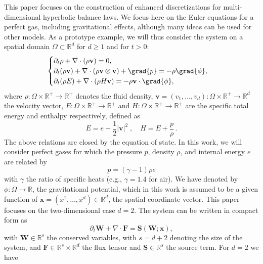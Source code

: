 \documentclass[a4paper,10pt]{article}
\begin{document}
This paper focuses on the construction of  enhanced discretizations for multi-dimensional hyperbolic balance laws. 
We focus here on  the Euler equations for a perfect gas, including gravitational effects, although many ideas can be used for other models.
As a prototype example, we will thus consider the system on a spatial domain $\Omega \subset \mathbb{R}^d$ for $d\geq 1$ and for $t>0$:
\begin{equation}\label{Euler_Eq0}
\begin{cases}
	\partial_t \rho + \nabla \cdot (\rho \mathbf{v}) = 0, \\
	\partial_t (\rho \mathbf{v}) + \nabla \cdot (\rho \mathbf{v} \otimes \mathbf{v}) + \grad{p} = -\rho \grad{\phi}, \\
	\partial_t (\rho E) + \nabla \cdot (\rho H \mathbf{v}) = -\rho \mathbf{v} \cdot \grad{\phi},
\end{cases}
\end{equation}
where $\rho : \Omega \times \mathbb R^+ \to \mathbb R^+ $ denotes the fluid density, $\mathbf{v} = (  v_1,\dots,v_d): \Omega \times \mathbb R^+ \to \mathbb R^d$ the velocity vector, $E: \Omega \times \mathbb R^+ \to \mathbb R^+ $ and $H: \Omega \times \mathbb R^+ \to \mathbb R^+ $ are the specific total energy and enthalpy respectively,
defined as
\begin{equation}\label{Euler_Eq1}
E = e + \dfrac{1}{2}|\mathbf{v}|^2\;,\quad H = E + \dfrac{p}{\rho}\,.
\end{equation}
The above relations are closed by the equation of state. In this work, we will consider perfect gases for which
the pressure $p$, density $\rho$, and  internal energy $e$ are related by
\begin{equation}\label{Euler_Eq2}
 p = (\gamma - 1)\rho e 
 \end{equation}
with $\gamma$ the ratio of specific heats (e.g., $\gamma = 1.4$ for air). We have denoted by $\phi : \Omega \to \mathbb R$, the gravitational potential,
which in this work is assumed to be a given function of  $\mathbf{x} =( x^1,\dots,x^d)\in\mathbb{R}^d$, the spatial coordinate vector. This paper focuses on the two-dimensional case $d=2$. The system can be  written in compact form as 
\begin{equation}\label{Euler_Eq3}
	\partial_t \bm{W} + \nabla\cdot  \mathbf{F}  = \mathbf{S}(\bm{W};\mathbf{x}),
\end{equation}
with $\bm{W}\in \mathbb R^{s}$ the conserved variables, with $s=d+2$ denoting the size of the system, and  $\mathbf{F}\in \mathbb{R}^{s}\times\mathbb{R}^{d}$ the flux tensor and $\mathbf{S}\in \mathbb{R}^{s}$ the source term.  For  $d=2$  we have
\end{document}
